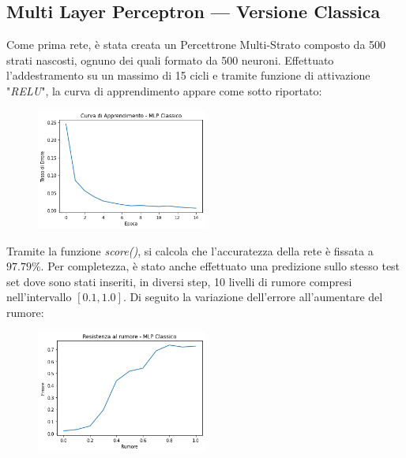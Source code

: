 \documentclass[12pt, a4paper]{article}
\begin{document}
\subsection{Multi Layer Perceptron --- Versione Classica}
Come prima rete, è stata creata un Percettrone Multi-Strato composto da 500 strati nascosti, ognuno dei quali formato da 500 neuroni. Effettuato l'addestramento su un massimo di 15 cicli e tramite funzione di attivazione "\textit{RELU}", la curva di apprendimento appare come sotto riportato:
\begin{figure}[H]
    \centering
    \includegraphics[width=0.50\textwidth]{Curva_MLP}
\end{figure}
Tramite la funzione \textit{score()}, si calcola che l'accuratezza della rete è fissata a \(97.79\%\).
Per completezza, è stato anche effettuato una predizione sullo stesso test set dove sono stati inseriti, in diversi step, 10 livelli di rumore compresi nell'intervallo \([0.1 , 1.0]\). Di seguito la variazione dell'errore all'aumentare del rumore:
\begin{figure}[H]
    \centering
    \includegraphics[width=0.50\textwidth]{Rumore_MLP.png}
\end{figure}
\end{document}
